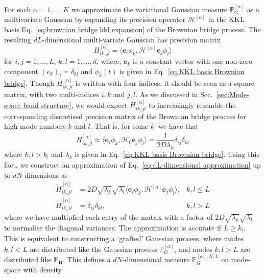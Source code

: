 For each $\alpha=1,\dots,K$ we approximate the variational Gaussian measure $\mathbb{\mathbb{P}}_G^{[\alpha]}$ as a multivariate Gaussian by expanding its precision operator $\mathcal{H}^{[\alpha]}$ in the KKL basis Eq.~\ref{eq:brownian bridge kkl expansion} of the Brownian bridge process. The resulting $dL$-dimensional multi-variate Gaussian has precision matrix
\begin{equation} \label{eq:dL-dimensional approximation}
	H_{ik,jl}^{[\alpha]} = \langle \mathbf{e}_{i} \phi_{k}, \mathcal{H}^{[\alpha]} \mathbf{e}_{j}\phi_{l} \rangle
\end{equation}
for $i,j=1,\dots,L$, $k,l=1,\dots,d$, where, $\mathbf{e}_{k}$ is a constant vector with one non-zero component $(e_{k})_{l}=\delta_{kl}$ and $\phi_k(t)$ is given in Eq.~\ref{eq:KKL basis Brownian bridge}. Though $H_{ik,jl}^{[\alpha]}$ is written with four indices, it should be seen as a square matrix, with two multi-indices $i,k$ and $j,l$. As we discussed in Sec.~\ref{sec:Mode-space band structure}, we would expect $H_{ik,jl}^{[\alpha]}$ to increasingly resemble the corresponding discretised precision matrix of the Brownian bridge process for high mode numbers $k$ and $l$. That is, for some $k_|$ we have that
\begin{equation} \label{eq:finite-dimensional projection of Gaussian approx}
	H_{ik,jl}^{[\alpha]} \approx \langle \mathbf{e}_{i} \phi_{k}, \mathcal{H}_0 \mathbf{e}_{j}\phi_{l} \rangle =  \frac{1}{2D \lambda_k} \delta_{ij} \delta_{kl}
\end{equation}
where $k,l > k_|$ and $\lambda_k$ is given in Eq.~\ref{eq:KKL basis Brownian bridge}. Using this fact, we construct an approximation of Eq.~\ref{eq:dL-dimensional approximation} up to $dN$ dimensions as
\begin{subequations} \label{eq:discretised precision matrix}
	\begin{align}
	\tilde{H}_{ik,jl}^{[\alpha]} & = 2D \sqrt{\lambda_k} \sqrt{\lambda_l} \langle \mathbf{e}_{i} \phi_{k}, \mathcal{H}^{[\alpha]} \mathbf{e}_{j}\phi_{l} \rangle, & k,l \leq L \\
	\tilde{H}_{ik,jl}^{[\alpha]} & = \delta_{ij} \delta_{kl}, & k,l > L
	\end{align}
\end{subequations}
where we have multiplied each entry of the matrix with a factor of $2D \sqrt{\lambda_k} \sqrt{\lambda_l}$ to normalise the diagonal variances. The approximation is accurate if $L \geq k_|$. This is equivalent to constructing a `grafted' Gaussian process, where modes $k,l < L$ are distributed like the Gaussian process $\mathbb{P}^{[\alpha]}_G$, and modes $k,l > L$ are distributed like $\mathbb{P}_\mathbf{B}$. This defines a $dN$-dimensional measure $\mathbb{P}^{[\alpha],N,L}_G$ on mode-space with density
